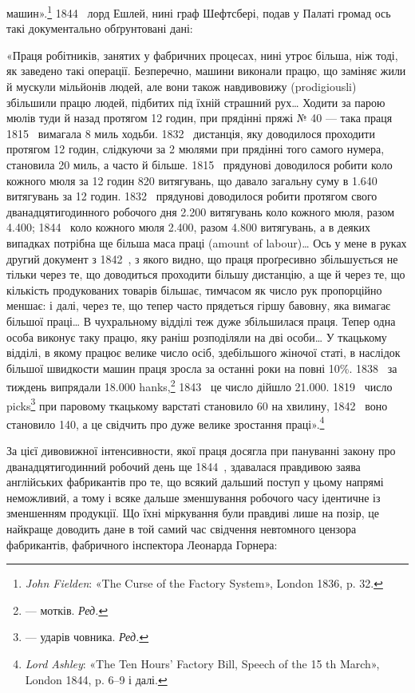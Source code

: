 \parcont{}  %
машин».\footnote{
\emph{John Fielden}: «The Curse of the Factory System», London
1836, p. 32.
} 1844~ лорд Ешлей, нині граф Шефтсбері, подав
у Палаті громад ось такі документально обґрунтовані дані:

«Праця робітників, занятих у фабричних процесах, нині утроє
більша, ніж тоді, як заведено такі операції. Безперечно, машини
виконали працю, що заміняє жили й мускули мільйонів людей,
але вони також навдивовижу (prodigiousli) збільшили працю
людей, підбитих під їхній страшний рух\dots{} Ходити за парою
мюлів туди й назад протягом 12 годин, при прядінні пряжі
№ 40 — така праця 1815~ вимагала 8 миль ходьби. 1832~
дистанція, яку доводилося проходити протягом 12 годин, слідкуючи
за 2 мюлями при прядінні того самого нумера, становила
20 миль, а часто й більше. 1815~ прядунові доводилося робити
коло кожного мюля за 12 годин 820 витягувань, що давало загальну
суму в \num{1.640} витягувань за 12 годин. 1832~ прядунові
доводилося робити протягом свого дванадцятигодинного робочого
дня \num{2.200} витягувань коло кожного мюля, разом \num{4.400}; 1844~
коло кожного мюля \num{2.400}, разом \num{4.800} витягувань, а в деяких
випадках потрібна ще більша маса праці (amount of labour)\dots{}
Ось у мене в руках другий документ з 1842~, з якого видно,
що праця проґресивно збільшується не тільки через те, що доводиться
проходити більшу дистанцію, а ще й через те, що кількість
продукованих товарів більшає, тимчасом як число рук пропорційно
меншає: і далі, через те, що тепер часто прядеться гіршу
бавовну, яка вимагає більшої праці\dots{} В чухральному відділі
теж дуже збільшилася праця. Тепер одна особа виконує таку
працю, яку раніш розподіляли на дві особи\dots{} У ткацькому відділі,
в якому працює велике число осіб, здебільшого жіночої
статі, в наслідок більшої швидкости машин праця зросла за
останні роки на повні 10\%. 1838~ за тиждень випрядали \num{18.000}
hanks,\footnote*{
— мотків. \emph{Ред.}
} 1843~ це число дійшло \num{21.000}. 1819~ число picks\footnote*{
— ударів човника. \emph{Ред.}
}
при паровому ткацькому варстаті становило 60 на хвилину, 1842~
воно становило 140, а це свідчить про дуже велике зростання
праці».\footnote{
\emph{Lord Ashley}: «The Ten Hours’ Factory Bill, Speech of the 15 th
March», London 1844, p. 6--9 і далі.
}

За цієї дивовижної інтенсивности, якої праця досягла при пануванні
закону про дванадцятигодинний робочий день ще 1844~,
здавалася правдивою заява англійських фабрикантів про те,
що всякий дальший поступ у цьому напрямі неможливий, а
тому і всяке дальше зменшування робочого часу ідентичне із
зменшенням продукції. Що їхні міркування були правдиві лише
на позір, це найкраще доводить дане в той самий час свідчення
невтомного цензора фабрикантів, фабричного інспектора Леонарда
Горнера:
